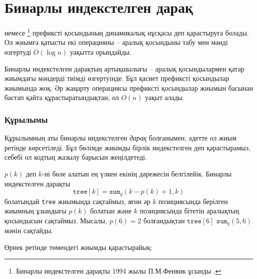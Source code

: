 \section{Бинарлы индекстелген дарақ}


 немесе 
\footnote{Бинарлы индекстелген дарақты 1994 жылы П.М.Фенвик ұсынды \cite{fen94}.} префиксті қосындының динамикалық нұсқасы деп
қарастыруға болады. Ол жиымға қатысты екі операцияны -- аралық 
қосындыны табу мен мәнді өзгертуді $O(\log n)$ уақытта орындайды.

Бинарлы индекстелген дарақтың артықшылығы -- 
аралық қосындылармен қатар жиымдағы мәндерді тиімді өзгертуінде.
Бұл қасиет префиксті қосындылар жиымында жоқ.  
Әр жаңарту операциясы префиксті қосындылар жиымын басынан бастап
қайта құрастыратындықтан, ол $O(n)$ уақыт алады. 

\subsubsection{Құрылымы}

Құрылымның аты бинарлы индекстелген \emph{дарақ} болғанымен, 
әдетте ол жиым ретінде көрсетіледі. Бұл бөлімде жиымды
бірлік индекстелген деп қарастырамыз, себебі ол кодтың жазылу барысын
жеңілдетеді. 

$p(k)$ деп $k$-ні бөле алатын ең үлкен екінің дәрежесін
белгілейік. Бинарлы индекстелген дарақты 
\[ \texttt{tree}[k] = \texttt{sum}_q(k-p(k)+1,k)\]
болатындай \texttt{tree} жиымында сақтаймыз,
яғни әр $k$ позициясында берілген жиымның ұзындығы
$p(k)$ болатын және $k$ позициясында бітетін аралықтың
қосындысын сақтаймыз. 
Мысалы, $p(6)=2$ болғандықтан $\texttt{tree}[6]$
$\texttt{sum}_q(5,6)$ мәнін сақтайды. 

Өрнек ретінде төмендегі жиымды қарастырайық:
\begin{center}
\end{center}

